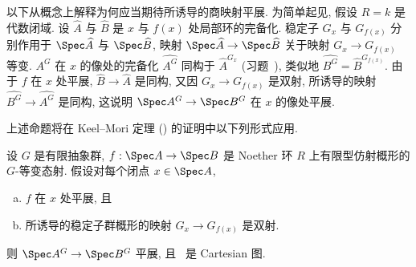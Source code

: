 \begin{remark}\label{src:5.4.4}
以下从概念上解释为何应当期待所诱导的商映射平展. 为简单起见, 假设 $R=k$ 是代数闭域. 设 $\widehat A$ 与 $\widehat B$ 是 $x$ 与 $f(x)$ 处局部环的完备化. 稳定子 $G_x$ 与 $G_{f(x)}$ 分别作用于 $\Spec\widehat A$ 与 $\Spec\widehat B$, 映射 $\Spec\widehat A\to\Spec\widehat B$ 关于映射 $G_x\to G_{f(x)}$ 等变. $A^G$ 在 $x$ 的像处的完备化 $\widehat{A^G}$ 同构于 $\widehat A^{G_x}$ (习题~), 类似地 $\widehat{B^G}=\widehat B^{G_{f(x)}}$. 由于 $f$ 在 $x$ 处平展, $\widehat B\to\widehat A$ 是同构, 又因 $G_x\to G_{f(x)}$ 是双射, 所诱导的映射 $\widehat{B^G}\to\widehat{A^G}$ 是同构, 这说明 $\Spec A^G\to\Spec B^G$ 在 $x$ 的像处平展.
\end{remark}
上述命题将在 Keel--Mori 定理 () 的证明中以下列形式应用.
\begin{corollary}\label{src:5.4.5}
设 $G$ 是有限抽象群, $f:\Spec A\to\Spec B$ 是 Noether 环 $R$ 上有限型仿射概形的 $G$-等变态射. 假设对每个闭点 $x\in\Spec A$,
\begin{enumerate}[(a)]
\item $f$ 在 $x$ 处平展, 且
\item 所诱导的稳定子群概形的映射 $G_x\to G_{f(x)}$ 是双射.
\end{enumerate}
则 $\Spec A^G\to\Spec B^G$ 平展, 且~ 是 Cartesian 图.
\end{corollary}

